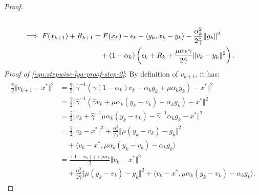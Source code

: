 \documentclass[12pt]{article}
\begin{document}
\begin{proof}
\begin{align}
            \notag
            \\
            \implies
            F(x_{k + 1}) + R_{k + 1}
            &=
            F(x_k) - \epsilon_k - \langle  g_k, x_k - y_k\rangle
            - \frac{\alpha_k^2}{2\hat \gamma}\Vert g_k\Vert^2
            \notag
            \\
            &\quad
                +
                (1 - \alpha_k)
                \left(
                    \epsilon_k + R_k +
                    \frac{\mu\alpha_k\gamma}{2\hat \gamma}
                    \Vert v_k - y_k\Vert^2
                \right).
        \end{align}
        \emph{Proof of \eqref{eqn:stepwise-lya-proof-step-2}}:
        By definition of $v_{k + 1}$, it has:
        \begin{align}\label{eqn:stepwise-lya-proof-eqn2}\begin{split}
            \frac{\hat \gamma}{2}\Vert v_{k + 1} - x^* \Vert^2
            &=
            \frac{\hat \gamma}{2}\Vert
                \hat \gamma^{-1}
                (
                    \gamma(1 - \alpha_k)v_k -
                    \alpha_k g_k + \mu \alpha_k y_k
                )
                - x^*
            \Vert^2
            \\
            &=
            \frac{\hat \gamma}{2}
            \Vert
                \hat \gamma^{-1}
                (
                \hat \gamma v_k + \mu \alpha_k(y_k - v_k)
                    - \alpha_k g_k
                )
                - x^*
            \Vert^2
            \\
            &=
            \frac{\hat \gamma}{2}
            \Vert
                v_k + \hat \gamma^{-1} \mu \alpha_k (y_k - v_k)
                - \hat \gamma^{-1}\alpha_k g_k
                - x^*
            \Vert^2
            \\
            &=
            \frac{\hat \gamma}{2}
            \Vert v_k - x^*\Vert^2
            +
            \frac{\alpha_k^2}{2\hat \gamma}\Vert \mu(y_k - v_k) - g_k\Vert^2
            \\ &\quad
                +
                \langle v_k - x^*, \mu \alpha_k(y_k - v_k) - \alpha_k g_k\rangle
            \\
            &=
            \frac{(1 - \alpha_k)\gamma + \mu \alpha_k}{2} \Vert v_k - x^*\Vert^2
            \\ &\quad
                +
                \frac{\alpha_k^2}{2\hat \gamma}
                \Vert \mu(y_k - v_k) - g_k\Vert^2
                +
                \langle v_k - x^*, \mu \alpha_k(y_k - v_k) - \alpha_k g_k\rangle.

\end{split}
\end{align}
\end{proof}
\end{document}
